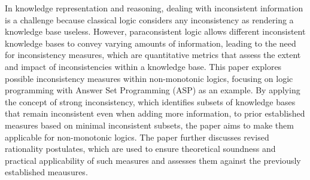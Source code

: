 In knowledge representation and reasoning, dealing with inconsistent information is a challenge because classical logic considers any inconsistency as rendering a knowledge base useless. However, paraconsistent logic allows different inconsistent knowledge bases to convey varying amounts of information, leading to the need for inconsistency measures, which are quantitative metrics that assess the extent and impact of inconsistencies within a knowledge base.
This paper explores possible inconsistency measures within non-monotonic logics, focusing on logic programming with Answer Set Programming (ASP) as an example. By applying the concept of strong inconsistency, which identifies subsets of knowledge bases that remain inconsistent even when adding more information, to prior established measures based on minimal inconsistent subsets, the paper aims to make them applicable for non-monotonic logics. The paper further discusses revised rationality postulates, which are used to ensure theoretical soundness and practical applicability of such measures and assesses them against the previously established meausures.
